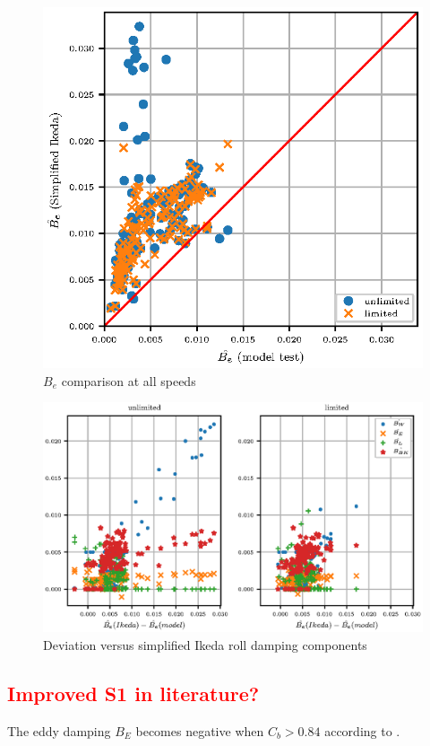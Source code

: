 \begin{figure}[H]
\centering
  \centering
  \includegraphics[width=1.0\columnwidth]{figures/ikeda_limited.eps}
  \caption{$\hat{B_e}$ comparison at all speeds}
  \label{fig:ikeda_limited}
\end{figure}

\begin{figure}[H]
\centering
  \centering
  \includegraphics[width=1.0\columnwidth]{figures/ikeda_components.eps}
  \caption{Deviation versus simplified Ikeda roll damping components}
  \label{fig:ikeda_limited}
\end{figure}



\textcolor{red}{\subsection{Improved S1 in literature?}}
The eddy damping $ B_E $ becomes negative when $ C_b>0.84 $ according to \parencite[]{rudakovic_application_2017}.

